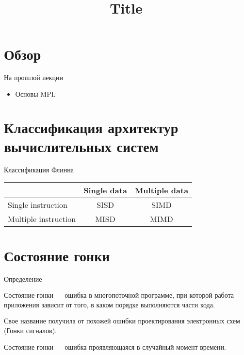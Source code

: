 

\title{Title}



\begin{frame}
\titlepage
\end{frame}

\section{Обзор}

\begin{frame}
\tableofcontents
\end{frame} 

\begin{frame}{На прошлой лекции}

\begin{itemize}
	\item Основы MPI.
\end{itemize}

\end{frame}

\section{Классификация архитектур вычислительных систем}

\begin{frame}{Классификация Флинна}

\begin{table}[htp]
	\begin{center}
	\begin{tabular}{|l|c|c|}
		\hline
		& Single data & Multiple data \\
		\hline
		Single instruction & SISD & SIMD \\
		\hline
		Multiple instruction & MISD & MIMD \\
		\hline
	\end{tabular}
	\end{center}
\end{table}

\end{frame}

\section{Состояние гонки}

\begin{frame}{Определение}

Состояние гонки --- ошибка в многопоточной программе, при которой работа приложения зависит от того, в каком порядке выполняются части кода.

Свое название получила от похожей ошибки проектирования электронных схем (Гонки сигналов).

Состояние гонки --- ошибка проявляющаяся в случайный момент времени.

\end{frame}

